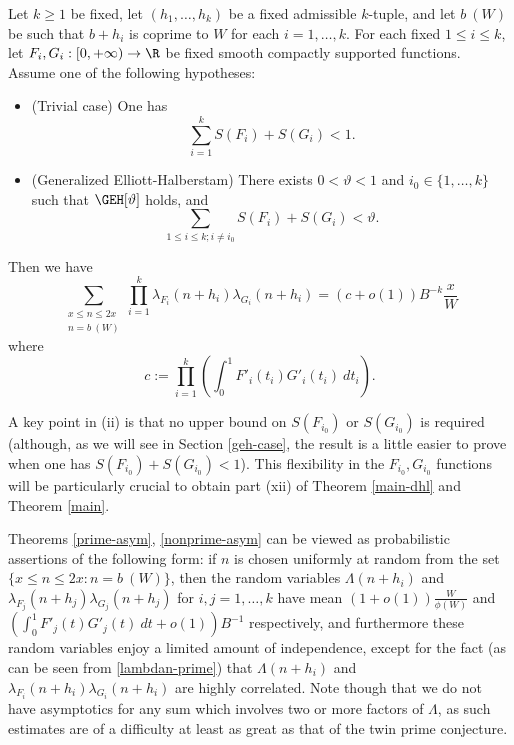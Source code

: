 \begin{theorem}\label{nonprime-asym}  Let $k \geq 1$ be fixed, let $(h_1,\dots,h_k)$ be a fixed admissible $k$-tuple, and let $b\ (W)$ be such that $b+h_i$ is coprime to $W$ for each $i=1,\dots,k$.  For each fixed $1 \leq i \leq k$, let $F_{i}, G_{i}: [0,+\infty) \to \R$ be fixed smooth compactly supported functions.  Assume one of the following hypotheses:
\begin{itemize}
\item[(i)]  (Trivial case)  One has
\begin{equation}\label{easy-upper}
\sum_{i=1}^k S(F_i) + S(G_i) < 1.
\end{equation}
\item[(ii)]  (Generalized Elliott-Halberstam) There exists $0 < \vartheta < 1$ and $i_0 \in \{1,\dots,k\}$ such that $\GEH[\vartheta]$ holds, and
\begin{equation}\label{eh-upper}
\sum_{1 \leq i \leq k; i \neq i_0} S(F_{i}) + S(G_{i}) < \vartheta.
\end{equation}
\end{itemize}
Then we have
\begin{equation}\label{lflg}
 \sum_{\substack{x \leq n \leq 2x\\ n = b\ (W)}} \prod_{i=1}^k \lambda_{F_{i}}(n+h_{i}) \lambda_{G_{i}}(n+h_{i}) = 
(c+o(1)) B^{-k} \frac{x}{W}
\end{equation}
where
\begin{equation}\label{c-def}
 c := \prod_{i=1}^k \left(\int_0^1 F'_i(t_i) G'_i(t_i)\ dt_i\right).
\end{equation}
\end{theorem}

A key point in (ii) is that no upper bound on $S(F_{i_0})$ or $S(G_{i_0})$ is required (although, as we will see in Section \ref{geh-case}, the result is a little easier to prove when one has $S(F_{i_0})+S(G_{i_0}) < 1$).  This flexibility in the $F_{i_0}, G_{i_0}$ functions will be particularly crucial to obtain part (xii) of Theorem \ref{main-dhl} and Theorem \ref{main}.

\begin{remark}  Theorems \ref{prime-asym}, \ref{nonprime-asym} can be viewed as probabilistic assertions of the following form: if $n$ is chosen uniformly at random from the set $\{ x \leq n \leq 2x: n = b\ (W)\}$, then the random variables $\Lambda(n+h_i)$ and $\lambda_{F_j}(n+h_j) \lambda_{G_j}(n+h_j)$ for $i,j=1,\dots,k$ have mean $(1+o(1)) \frac{W}{\phi(W)}$ and $(\int_0^1 F'_j(t) G'_j(t)\ dt + o(1)) B^{-1}$ respectively, and furthermore these random variables enjoy a limited amount of independence, except for the fact (as can be seen from \eqref{lambdan-prime}) that $\Lambda(n+h_i)$ and $\lambda_{F_i}(n+h_i) \lambda_{G_i}(n+h_i)$ are highly correlated.  Note though that we do not have asymptotics for any sum which involves two or more factors of $\Lambda$, as such estimates are of a difficulty at least as great as that of the twin prime conjecture.
\end{remark}



